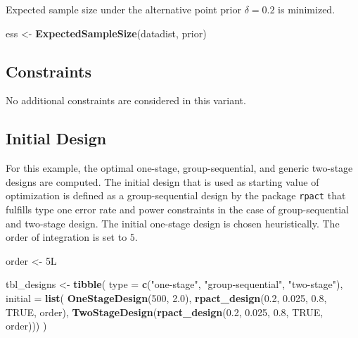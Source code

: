\documentclass[]{book}
\newenvironment{Shaded}{\begin{snugshade}}{\end{snugshade}}
\newcommand{\DataTypeTok}[1]{\textcolor[rgb]{0.13,0.29,0.53}{#1}}
\newcommand{\DecValTok}[1]{\textcolor[rgb]{0.00,0.00,0.81}{#1}}
\newcommand{\FloatTok}[1]{\textcolor[rgb]{0.00,0.00,0.81}{#1}}
\newcommand{\KeywordTok}[1]{\textcolor[rgb]{0.13,0.29,0.53}{\textbf{#1}}}
\newcommand{\NormalTok}[1]{#1}
\newcommand{\OtherTok}[1]{\textcolor[rgb]{0.56,0.35,0.01}{#1}}
\newcommand{\StringTok}[1]{\textcolor[rgb]{0.31,0.60,0.02}{#1}}
\begin{document}
Expected sample size under the alternative point prior \(\delta = 0.2\)
is minimized.

\begin{Shaded}
\begin{Highlighting}[]
\NormalTok{ess <-}\StringTok{ }\KeywordTok{ExpectedSampleSize}\NormalTok{(datadist, prior)}
\end{Highlighting}
\end{Shaded}

\hypertarget{constraints-7}{%
\subsection{Constraints}\label{constraints-7}}

No additional constraints are considered in this variant.

\hypertarget{initial-design-5}{%
\subsection{Initial Design}\label{initial-design-5}}

For this example, the optimal one-stage, group-sequential, and generic
two-stage designs are computed.
The initial design that is used as starting value of optimization is defined
as a group-sequential design by the package \texttt{rpact} that fulfills
type one error rate and power constraints in the case of group-sequential and
two-stage design.
The initial one-stage design is chosen heuristically.
The order of integration is set to \(5\).

\begin{Shaded}
\begin{Highlighting}[]
\NormalTok{order <-}\StringTok{ }\NormalTok{5L }

\NormalTok{tbl_designs <-}\StringTok{ }\KeywordTok{tibble}\NormalTok{(}
    \DataTypeTok{type    =} \KeywordTok{c}\NormalTok{(}\StringTok{"one-stage"}\NormalTok{, }\StringTok{"group-sequential"}\NormalTok{, }\StringTok{"two-stage"}\NormalTok{),}
    \DataTypeTok{initial =} \KeywordTok{list}\NormalTok{(}
        \KeywordTok{OneStageDesign}\NormalTok{(}\DecValTok{500}\NormalTok{, }\FloatTok{2.0}\NormalTok{),}
        \KeywordTok{rpact_design}\NormalTok{(}\FloatTok{0.2}\NormalTok{, }\FloatTok{0.025}\NormalTok{, }\FloatTok{0.8}\NormalTok{, }\OtherTok{TRUE}\NormalTok{, order),}
        \KeywordTok{TwoStageDesign}\NormalTok{(}\KeywordTok{rpact_design}\NormalTok{(}\FloatTok{0.2}\NormalTok{, }\FloatTok{0.025}\NormalTok{, }\FloatTok{0.8}\NormalTok{, }\OtherTok{TRUE}\NormalTok{, order))) )}
\end{Highlighting}
\end{Shaded}
\end{document}
